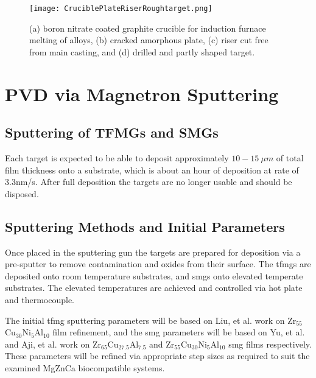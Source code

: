 \documentclass[a4paper,12pt,oneside]{report}%
\begin{document}
\begin{figure}[htbp]
	\centering
	\texttt{[image: CruciblePlateRiserRoughtarget.png]}
	\caption{(a) boron nitrate coated graphite crucible for induction furnace melting of alloys, (b) cracked amorphous plate, (c) riser cut free from main casting, and (d) drilled and partly shaped target.}
	\label{fig:CrucibleShaping}
\end{figure}

\section{PVD via Magnetron Sputtering}
\subsection{Sputtering of TFMGs and SMGs}
Each target is expected to be able to deposit approximately $10 - 15~ \mu m$ of total film thickness onto a substrate, which is about an hour of deposition at rate of 3.3nm/s. After full deposition the targets are no longer usable and should be disposed. 

\subsection{Sputtering Methods and Initial Parameters}
Once placed in the sputtering gun the targets are prepared for deposition via a pre-sputter to remove contamination and oxides from their surface. The \glspl{tfmg} are deposited onto room temperature substrates, and \glspl{smg} onto elevated temperate substrates. The elevated temperatures are achieved and controlled via hot plate and thermocouple.

The initial \gls{tfmg} sputtering parameters will be based on Liu, et al. \cite{Liu2012} work on Zr$_{55}$Cu$_{30}$Ni$_{5}$Al$_{10}$ film refinement, and the \gls{smg} parameters will be based on Yu, et al. \cite{Yu2013} and Aji, et al. \cite{Aji2013} work on Zr$_{65}$Cu$_{27.5}$Al$_{7.5}$ and Zr$_{55}$Cu$_{30}$Ni$_{5}$Al$_{10}$ \gls{smg} films respectively. These parameters will be refined via appropriate step sizes as required to suit the examined MgZnCa biocompatible systems. 
\end{document}
